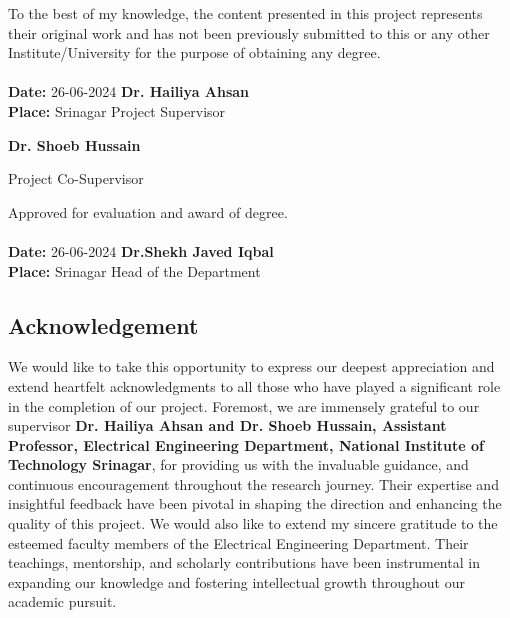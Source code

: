 \documentclass[12pt,a4paper]{report}
\begin{document}
To the best of my knowledge, the content presented in this project represents their original work and has not been previously submitted to this or any other Institute/University for the purpose of obtaining any degree.\\
\vspace{20pt}\\
\noindent \textbf{Date:} {26-06-2024} \hfill \textbf{Dr. Hailiya Ahsan}\\
\noindent \textbf{Place:} {Srinagar} \hfill Project Supervisor\\
\begin{flushright}\textbf{Dr. Shoeb Hussain} \end{flushright}
\begin{flushright}Project Co-Supervisor \end{flushright}
Approved for evaluation and award of degree.\\
\vspace{20pt}\\
\noindent \textbf{Date:} {26-06-2024} \hfill \textbf{Dr.Shekh Javed Iqbal}\\
\noindent \textbf{Place:} {Srinagar} \hfill Head of the Department\\
\clearpage
\begin{center}
	\section*{Acknowledgement}
	\noindent{\rule{\textwidth}{1.5pt}}
\end{center}
We would like to take this opportunity to express our deepest appreciation and extend heartfelt acknowledgments to all those who have played a significant role in the completion of our project. Foremost, we are immensely grateful to our supervisor \textbf{Dr. Hailiya Ahsan and Dr. Shoeb Hussain, Assistant Professor, Electrical Engineering Department, National Institute of Technology Srinagar}, for providing us with the invaluable guidance, and continuous encouragement throughout the research journey. Their expertise and insightful feedback have been pivotal in shaping the direction and enhancing the quality of this project. We would also like to extend my sincere gratitude to the esteemed faculty members of the Electrical Engineering Department. Their teachings, mentorship, and scholarly contributions have been instrumental in expanding our knowledge and fostering intellectual growth throughout our academic pursuit.
\end{document}
